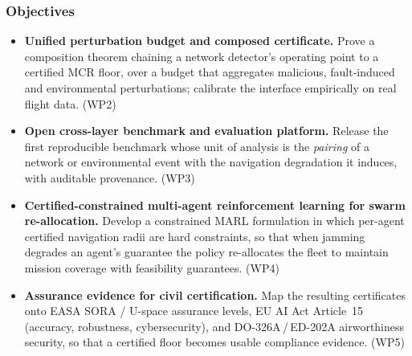 \documentclass[11pt,a4paper]{article}
\begin{document}
\subsubsection{Objectives}
\begin{itemize}
\item[\textbf{O1}] \textbf{Unified perturbation budget and composed certificate.} Prove a composition theorem chaining a network detector's operating point to a certified MCR floor, over a budget that aggregates malicious, fault-induced and environmental perturbations; calibrate the interface empirically on real flight data. (WP2)
\item[\textbf{O2}] \textbf{Open cross-layer benchmark and evaluation platform.} Release the first reproducible benchmark whose unit of analysis is the \emph{pairing} of a network or environmental event with the navigation degradation it induces, with auditable provenance. (WP3)
\item[\textbf{O3}] \textbf{Certified-constrained multi-agent reinforcement learning for swarm re-allocation.} Develop a constrained MARL formulation in which per-agent certified navigation radii are hard constraints, so that when jamming degrades an agent's guarantee the policy re-allocates the fleet to maintain mission coverage with feasibility guarantees. (WP4)
\item[\textbf{O4}] \textbf{Assurance evidence for civil certification.} Map the resulting certificates onto EASA SORA / U-space assurance levels, EU AI Act Article~15 (accuracy, robustness, cybersecurity), and DO-326A\,/\,ED-202A airworthiness security, so that a certified floor becomes usable compliance evidence. (WP5)
\end{itemize}
\end{document}
